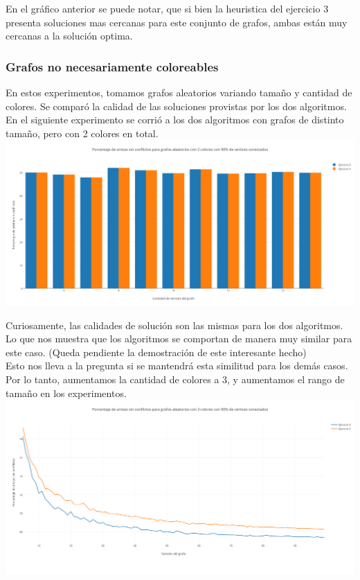 En el gráfico anterior se puede notar, que si bien la heuristica del ejercicio 3 presenta soluciones mas cercanas para este conjunto de grafos, ambas están muy cercanas a la solución optima.


\subsubsection{Grafos no necesariamente coloreables}

En estos experimentos, tomamos grafos aleatorios variando tamaño y cantidad de colores. Se comparó la calidad de las soluciones provistas por los dos algoritmos.\\

En el siguiente experimento se corrió a los dos algoritmos con grafos de distinto tamaño, pero con 2 colores en total.
\includegraphics[scale=0.35]{./imagenes5/conf2.png}

Curiosamente, las calidades de solución son las mismas para los dos algoritmos. Lo que nos muestra que los algoritmos se comportan de manera muy similar para este caso. (Queda pendiente la demostración de este interesante hecho)\\
Esto nos lleva a la pregunta si se mantendrá esta similitud para los demás casos. Por lo tanto, aumentamos la cantidad de colores a 3, y aumentamos el rango de tamaño en los experimentos. \\

\includegraphics[scale=0.45]{./imagenes5/conf3.png}

